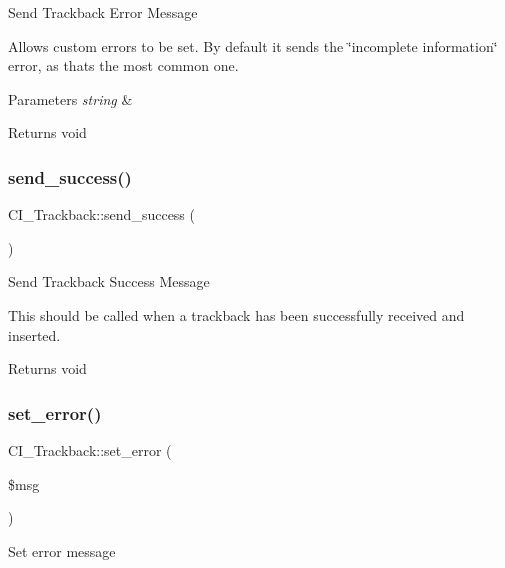 Send Trackback Error Message

Allows custom errors to be set. By default it sends the \char`\"{}incomplete information\char`\"{} error, as that\textquotesingle{}s the most common one.


\begin{DoxyParams}{Parameters}
{\em string} & \\
\hline
\end{DoxyParams}
\begin{DoxyReturn}{Returns}
void 
\end{DoxyReturn}
\mbox{\label{class_c_i___trackback_ae594681a931f07c1946663aaaf97e3f1}} 
\subsubsection{\texorpdfstring{send\+\_\+success()}{send\_success()}}
{\footnotesize\ttfamily C\+I\+\_\+\+Trackback\+::send\+\_\+success (\begin{DoxyParamCaption}{ }\end{DoxyParamCaption})}

Send Trackback Success Message

This should be called when a trackback has been successfully received and inserted.

\begin{DoxyReturn}{Returns}
void 
\end{DoxyReturn}
\mbox{\label{class_c_i___trackback_a1d986be918a259c99a569d35f5a3d345}} 
\subsubsection{\texorpdfstring{set\+\_\+error()}{set\_error()}}
{\footnotesize\ttfamily C\+I\+\_\+\+Trackback\+::set\+\_\+error (\begin{DoxyParamCaption}\item[{}]{\$msg }\end{DoxyParamCaption})}

Set error message


